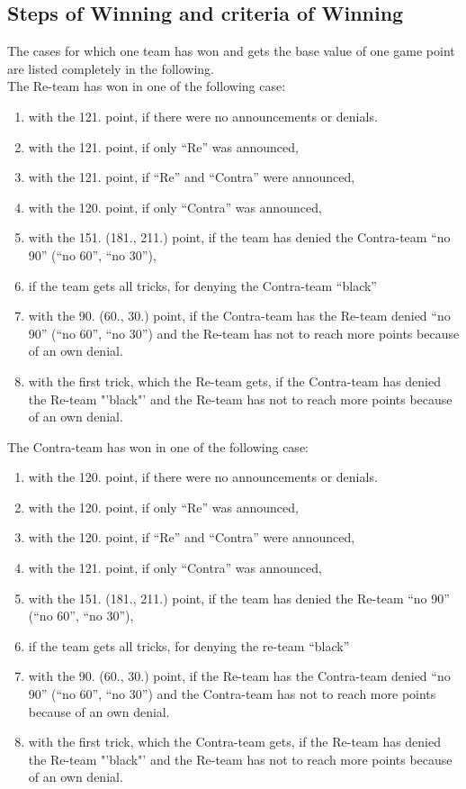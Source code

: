 \documentclass[12pt,a4paper]{article}
\begin{document}
\subsection{Steps of Winning and criteria of Winning} The cases
for which one team has won and gets the base value of one game
point are listed completely
in the following.\\
The Re-team has won in one of the following case:
\begin{enumerate}
\item with the 121. point, if there were no announcements or denials.
\item with the 121. point, if only "`Re"' was announced,
\item with the 121. point, if "`Re"' and "`Contra"' were announced,
\item with the 120. point, if only "`Contra"' was announced,
\item with the 151. (181., 211.) point, if the team has denied the Contra-team "`no 90"' ("`no 60"', "`no 30"'),
\item if the team gets all tricks, for denying the Contra-team "`black"'
\item with the 90. (60., 30.) point, if the Contra-team has the Re-team denied "`no 90"' ("`no 60"', "`no 30"') and
the Re-team has not to reach more points because of an own denial.
\item with the first trick, which the Re-team gets, if the Contra-team has denied the Re-team "'black"' and
the Re-team has not to reach more points because of an own denial.
\end{enumerate}
The Contra-team has won in one of the following case:
\begin{enumerate}
\item with the 120. point, if there were no announcements or denials.
\item with the 120. point, if only "`Re"' was announced,
\item with the 120. point, if "`Re"' and "`Contra"' were announced,
\item with the 121. point, if only "`Contra"' was announced,
\item with the 151. (181., 211.) point, if the team has denied the Re-team "`no 90"' ("`no 60"', "`no 30"'),
\item if the team gets all tricks, for denying the re-team "`black"'
\item with the 90. (60., 30.) point, if the Re-team has the Contra-team denied "`no 90"' ("`no 60"', "`no 30"') and
the Contra-team has not to reach more points because of an own
denial.
\item with the first trick, which the Contra-team gets, if the Re-team has denied the Re-team "'black"' and
the Re-team has not to reach more points because of an own denial.
\end{enumerate}
\end{document}
